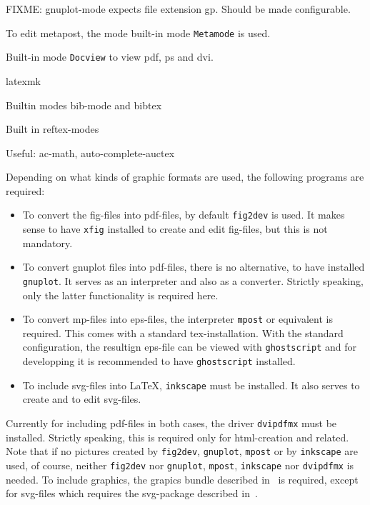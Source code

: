 \documentclass[12pt]{book}
\begin{document}
FIXME: gnuplot-mode expects file extension gp. 
Should be made configurable. 

To edit metapost, the mode built-in mode {\tt Metamode} is used. 

Built-in mode {\tt Docview} to view pdf, ps and dvi. 

latexmk

Builtin modes bib-mode and bibtex

Built in reftex-modes

Useful: 
ac-math, auto-complete-auctex

Depending on what kinds of graphic formats are used, 
the following programs are required: 
%
\begin{itemize}
\item
To convert the \gls{fig}-files into \gls{pdf}-files, 
by default {\tt fig2dev} is used. 
It makes sense to have {\tt xfig} installed 
to create and edit fig-files, but this is not mandatory. 
\item
To convert gnuplot files into pdf-files, there is no alternative, 
to have installed {\tt gnuplot}. 
It serves as an interpreter and also as a converter. 
Strictly speaking, only the latter functionality is required here. 
\item
To convert \gls{mp}-files into \gls{eps}-files, 
the interpreter {\tt mpost} or equivalent is required. 
This comes with a standard tex-installation. 
With the standard configuration, 
the resultign eps-file can be viewed with {\tt ghostscript} 
and for developping it is recommended to have {\tt ghostscript} installed. 
\item
To include \gls{svg}-files into \LaTeX{}, 
{\tt inkscape} must be installed. 
It also serves to create and to edit svg-files. 
\end{itemize}



Currently for including pdf-files in both cases, 
the driver {\tt dvipdfmx} must be installed. 
Strictly speaking, this is required only for html-creation and related. 
Note that if no pictures created by {\tt fig2dev}, {\tt gnuplot}, 
{\tt mpost} or by {\tt inkscape} are used, of course, 
neither {\tt fig2dev} nor {\tt gnuplot}, {\tt mpost}, {\tt inkscape} 
nor {\tt dvipdfmx} is needed. 
To include graphics, the grapics bundle described in~\cite{GraX} is required, 
except for svg-files which requires the svg-package 
described in~\cite{SvgP}. 
\end{document}
